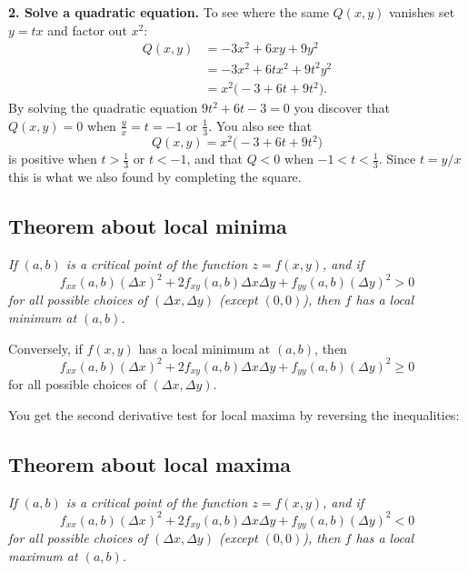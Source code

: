 \smallskip
\hspace{2em}\textbf{2. Solve a quadratic equation. }
To see where the same  $Q(x, y)$ vanishes 
set $y=tx$ and factor out $x^2$:
\begin{align*}
  Q(x, y) &= -3x^2+6xy+9y^2\\
  &= -3x^2 + 6tx^2 + 9t^2 y^2 \\
  &= x^2 \bigl(-3+6t+9t^2\bigr).
\end{align*}
By solving the quadratic equation $9t^2+6t-3=0$ you discover
that $Q(x, y) = 0$ when $\frac{y} {x} = t = -1$ or $\frac 13$.
You also see that
\[
Q(x, y) =x^2 \bigl(-3+6t+9t^2\bigr)
\]
is positive when $t>\frac13$ or $t<-1$, and that $Q<0$
when $-1<t<\frac13$.  Since $t=y/x$ this is what we
also found by completing the square.


\subsection*{Theorem about local minima} \itshape 
If $(a,b)$ is a critical point of the function $z=f(x, y)$, and if 
\begin{equation}
  f_{xx}(a, b)(\Delta x)^2 + 2f_{xy}(a,b)\Delta x \Delta y +
  f_{yy}(a,b)(\Delta y)^2 >0
  \label{eq:positive-definite}
\end{equation}
for all possible choices of $(\Delta x, \Delta y)$ (except $(0,0)$), then
$f$ has a local minimum at $(a,b)$.

Conversely, if $f(x,y)$ has a local minimum at $(a,b)$, then 
\begin{equation}
  f_{xx}(a, b)(\Delta x)^2 + 2f_{xy}(a,b)\Delta x \Delta y +
  f_{yy}(a,b)(\Delta y)^2 \geq 0
  \label{eq:positive-semidefinite}
\end{equation}
for all possible choices of $(\Delta x, \Delta y)$.
\upshape

You get the second derivative test for local maxima by reversing the
inequalities:
\subsection*{Theorem about local maxima} \itshape
If $(a,b)$ is a critical point of the function $z=f(x, y)$, and if 
\begin{equation}
  f_{xx}(a, b)(\Delta x)^2 + 2f_{xy}(a,b)\Delta x \Delta y +
  f_{yy}(a,b)(\Delta y)^2 < 0
  \label{eq:negative-definite}
\end{equation}
for all possible choices of $(\Delta x, \Delta y)$ (except $(0,0)$), then
$f$ has a local maximum at $(a,b)$.

